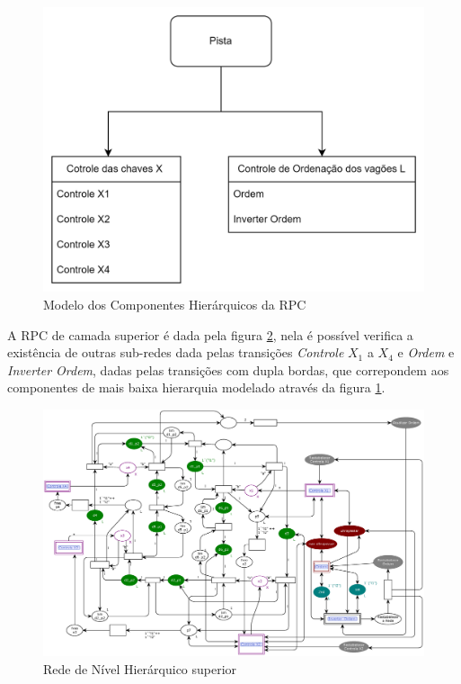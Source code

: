 \begin{figure}[ht]
    \centering
    \caption{Modelo dos Componentes Hierárquicos da RPC}
    \label{fig:hierarquia_RPC}
    \includegraphics[width=0.8\linewidth]{figures//Simulation//Modelagem/hierarquia.png}
\end{figure}

A RPC de camada superior é dada pela figura \ref{fig:rede_geral}, nela é possível verifica a existência de outras sub-redes dada pelas transições \textit{Controle} $X_1$ a $X_4$ e \textit{Ordem} e \textit{Inverter Ordem}, dadas pelas transições com dupla bordas, que correpondem aos componentes de mais baixa hierarquia modelado através da figura \ref{fig:hierarquia_RPC}.

\begin{figure}[ht]
    \centering
    \caption{Rede de Nível Hierárquico superior}
    \label{fig:rede_geral}
    \includegraphics[width=1\linewidth]{figures/Simulation/Modelagem/rede_geral.eps}
\end{figure}


